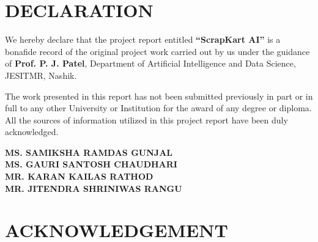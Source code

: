 \newpage
\chapter*{DECLARATION}
\thispagestyle{empty}
\vspace{0.7cm}

We hereby declare that the project report entitled \textbf{“ScrapKart AI”} is a bonafide record of the original project work carried out by us under the guidance of \textbf{Prof. P. J. Patel}, Department of Artificial Intelligence and Data Science, JESITMR, Nashik. 

The work presented in this report has not been submitted previously in part or in full to any other University or Institution for the award of any degree or diploma. All the sources of information utilized in this project report have been duly acknowledged.

\begin{flushright}
\vspace{1.5cm}
\begin{minipage}{0.5\textwidth}
\begin{flushleft}
\textbf{MS. SAMIKSHA RAMDAS GUNJAL}\\[0.2cm]
\textbf{MS. GAURI SANTOSH CHAUDHARI}\\[0.2cm]
\textbf{MR. KARAN KAILAS RATHOD}\\[0.2cm]
\textbf{MR. JITENDRA SHRINIWAS RANGU}\\[0.2cm]
\end{flushleft}
\end{minipage}
\end{flushright}


\newpage
\chapter*{ACKNOWLEDGEMENT}
\thispagestyle{empty}
    \vspace{0.7cm} 
   
